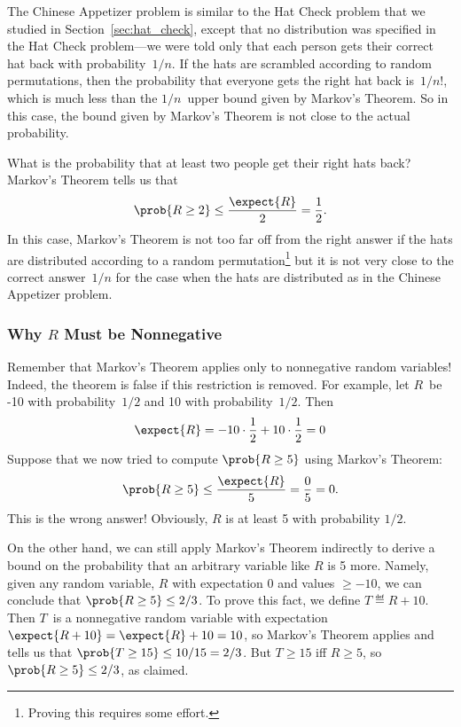 The Chinese Appetizer problem is similar to the Hat Check problem that
we studied in Section~\ref{sec:hat_check}, except that no distribution
was specified in the Hat Check problem---we were told only that each
person gets their correct hat back with probability~$1/n$.  If the
hats are scrambled according to random permutations, then the
probability that everyone gets the right hat back is~$1/n!$, which is
much less than the $1/n$~upper bound given by Markov's Theorem.  So in
this case, the bound given by Markov's Theorem is not close to the
actual probability.

What is the probability that at least two people get their right hats
back?  Markov's Theorem tells us that
\begin{equation*}
    \prob{R \ge 2} \le \frac{\expect{R}}{2} = \frac{1}{2}.
\end{equation*}
In this case, Markov's Theorem is not too far off from the right
answer if the hats are distributed according to a random
permutation\footnote{Proving this requires some effort.} but it is not
very close to the correct answer~$1/n$ for the case when the hats are
distributed as in the Chinese Appetizer problem.

\subsubsection{Why $R$ Must be Nonnegative}

Remember that Markov's Theorem applies only to nonnegative random
variables!  Indeed, the theorem is false if this restriction is
removed.  For example, let $R$~be -10 with probability~$1/2$ and 10
with probability~$1/2$.  Then
\[
\expect{R} = -10 \cdot \frac{1}{2} + 10 \cdot \frac{1}{2} = 0
\]
Suppose that we now tried to compute $\prob{R \geq 5}$ using Markov's
Theorem:
\begin{equation*}
  \prob{R \geq 5} \leq \frac{\expect{R}}{5} = \frac{0}{5} = 0.
\end{equation*}
This is the wrong answer!  Obviously, $R$ is at least 5 with
probability $1/2$.

On the other hand, we can still apply Markov's Theorem indirectly to
derive a bound on the probability that an arbitrary variable like $R$
is 5 more.  Namely, given any random variable, $R$ with expectation 0
and values $\geq -10$, we can conclude that $\prob{R \geq 5} \le 2/3$.
To prove this fact, we define $T \eqdef R+10$.  Then $T$~is a
nonnegative random variable with expectation $\expect{R + 10} =
\expect{R}+10= 10$, so Markov's Theorem applies and tells us that
$\prob{T \geq 15} \le 10/15 = 2/3$.  But $T \geq 15$ iff $R \geq 5$, so
$\prob{R \geq 5} \leq 2/3$, as claimed.

